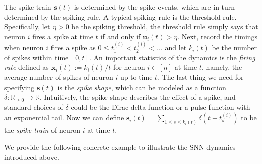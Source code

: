 \documentclass[11pt]{article}
\theoremstyle{remark}
\theoremstyle{definition}
\newcommand{\bx}{\mathbf{x}}
\newcommand{\bu}{\mathbf{u}}
\newcommand{\bs}{\mathbf{s}}
\newcommand{\ie} {{\it i.e.,\ }}
\newcommand{\R}{{\mathbb R}} %
\begin{document}
The spike train $\bs(t)$ is determined by the spike events, which are in turn determined by the spiking rule. A typical spiking rule is the threshold rule. Specifically, let $\eta>0$ be the spiking threshold, the threshold rule simply says that neuron $i$ fires a spike at time $t$ if and only if $\bu_i(t)>\eta$. Next, record the timings when neuron $i$ fires a spike as $0\leq t_1^{(i)}<t_2^{(i)}<\dots$ and let $k_i(t)$ be the number of spikes within time $[0,t]$. An important statistics of the dynamics is the \textit{firing rate} defined as $\bx_i(t) := k_i(t) / t$ for neuron $i\in[n]$ at time $t$, namely, the average number of spikes of neuron $i$ up to time $t$. The last thing we need for specifying $\bs(t)$ is the \textit{spike shape}, which can be modeled as a function $\delta:\R_{\geq0}\rightarrow\R$. Intuitively, the spike shape describes the effect of a spike, and standard choices of $\delta$ could be the Dirac delta function or a pulse function with an exponential tail. Now we can define $\bs_i(t)=\sum_{1\leq s\leq k_i(t)}\delta(t-t_s^{(i)})$ to be the \textit{spike train} of neuron $i$ at time $t$.


We provide the following concrete example to illustrate the SNN dynamics introduced above.
\end{document}
